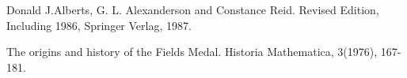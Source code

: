 \bigskip
\bigskip


\Ref

     {Donald J.Alberts, G. L. Alexanderson and Constance Reid.}
     {Revised Edition, Including 1986,  Springer Verlag, 1987.}

        {The origins and history of the Fields Medal.}
        {Historia Mathematica,} {3(1976), 167-181.}



